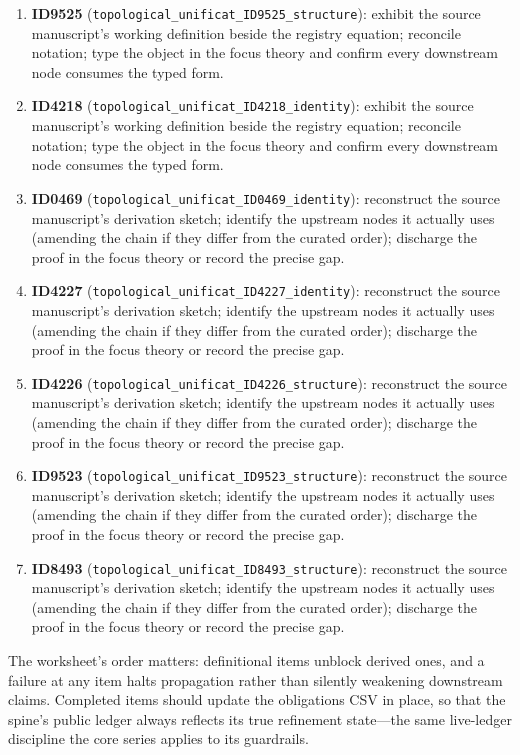 \documentclass[11pt]{article}
\theoremstyle{remark}
\begin{document}
\begin{enumerate}
\item \textbf{ID9525} (\texttt{topological\_unificat\_ID9525\_structure}): exhibit the source manuscript's working definition beside the registry equation; reconcile notation; type the object in the focus theory and confirm every downstream node consumes the typed form.
\item \textbf{ID4218} (\texttt{topological\_unificat\_ID4218\_identity}): exhibit the source manuscript's working definition beside the registry equation; reconcile notation; type the object in the focus theory and confirm every downstream node consumes the typed form.
\item \textbf{ID0469} (\texttt{topological\_unificat\_ID0469\_identity}): reconstruct the source manuscript's derivation sketch; identify the upstream nodes it actually uses (amending the chain if they differ from the curated order); discharge the proof in the focus theory or record the precise gap.
\item \textbf{ID4227} (\texttt{topological\_unificat\_ID4227\_identity}): reconstruct the source manuscript's derivation sketch; identify the upstream nodes it actually uses (amending the chain if they differ from the curated order); discharge the proof in the focus theory or record the precise gap.
\item \textbf{ID4226} (\texttt{topological\_unificat\_ID4226\_structure}): reconstruct the source manuscript's derivation sketch; identify the upstream nodes it actually uses (amending the chain if they differ from the curated order); discharge the proof in the focus theory or record the precise gap.
\item \textbf{ID9523} (\texttt{topological\_unificat\_ID9523\_structure}): reconstruct the source manuscript's derivation sketch; identify the upstream nodes it actually uses (amending the chain if they differ from the curated order); discharge the proof in the focus theory or record the precise gap.
\item \textbf{ID8493} (\texttt{topological\_unificat\_ID8493\_structure}): reconstruct the source manuscript's derivation sketch; identify the upstream nodes it actually uses (amending the chain if they differ from the curated order); discharge the proof in the focus theory or record the precise gap.
\end{enumerate}

The worksheet's order matters: definitional items unblock derived ones, and a failure at any item halts propagation rather than silently weakening downstream claims. Completed items should update the obligations CSV in place, so that the spine's public ledger always reflects its true refinement state---the same live-ledger discipline the core series applies to its guardrails.
\end{document}
